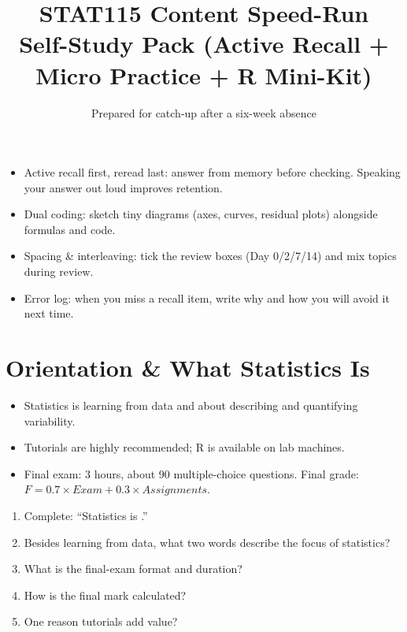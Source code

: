 \documentclass[11pt,a4paper]{article}
\title{\vspace{-1.5em}\textbf{STAT115 Content Speed-Run}\\
\large Self-Study Pack (Active Recall + Micro Practice + R Mini-Kit)}
\author{Prepared for catch-up after a six-week absence}
\date{}
\def\textbf#1{#1}%
\begin{document}
\maketitle

\begin{tcolorbox}[colback=SoftBg,colframe=Accent!40!black,breakable,boxrule=0.5pt,arc=2mm,title=\textbf{How to use this pack (learning-science built-in)}]
\begin{itemize}
  \item \textbf{Active recall first, reread last:} answer from memory before checking. Speaking your answer out loud improves retention.
  \item \textbf{Dual coding:} sketch tiny diagrams (axes, curves, residual plots) alongside formulas and code.
  \item \textbf{Spacing \& interleaving:} tick the review boxes (Day 0/2/7/14) and mix topics during review.
  \item \textbf{Error log:} when you miss a recall item, write why and how you will avoid it next time.
\end{itemize}
\end{tcolorbox}

\tableofcontents
\newpage

\section{Orientation \& What Statistics Is}

\begin{corebox}
\begin{itemize}
  \item Statistics is \textbf{learning from data} and about \textbf{describing and quantifying variability}.
  \item Tutorials are highly recommended; R is available on lab machines.
  \item Final exam: \textbf{3 hours}, about \textbf{90 multiple-choice} questions. Final grade: \(F = 0.7\times Exam + 0.3\times Assignments\).
\end{itemize}
\end{corebox}

\begin{recallbox}
\begin{enumerate}
  \item Complete: ``Statistics is \underline{\hspace{4cm}}.''
  \item Besides learning from data, what two words describe the focus of statistics?
  \item What is the final-exam format and duration?
  \item How is the final mark calculated?
  \item One reason tutorials add value?
\end{enumerate}
\end{recallbox}
\end{document}
